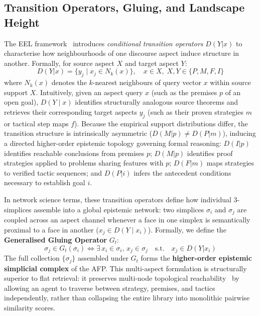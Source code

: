 \documentclass{svproc}
\begin{document}
\subsection{Transition Operators, Gluing, and Landscape Height}\label{sec:operators}

The EEL framework~\cite{correia_eel_inprep} introduces \emph{conditional transition operators} $D(Y | x)$ to characterise how neighbourhoods of one discourse aspect induce structure in another. Formally, for source aspect $X$ and target aspect $Y$:
\begin{equation}
D(Y | x) = \{ y_j \mid x_j \in N_k(x) \}, \quad x \in X,\; X, Y \in \{P, M, F, I\}
\end{equation}
where $N_k(x)$ denotes the $k$-nearest neighbours of query vector $x$ within source support $X$. Intuitively, given an aspect query $x$ (such as the premises $p$ of an open goal), $D(Y \mid x)$ identifies structurally analogous source theorems and retrieves their corresponding target aspects $y_j$ (such as their proven strategies $m$ or tactical step maps $f$). Because the empirical support distributions differ, the transition structure is intrinsically asymmetric ($D(M | p) \ne D(P | m)$), inducing a directed higher-order epistemic topology governing formal reasoning: $D(I | p)$ identifies reachable conclusions from premises $p$; $D(M | p)$ identifies proof strategies applied to problems sharing features with $p$; $D(F | m)$ maps strategies to verified tactic sequences; and $D(P | i)$ infers the antecedent conditions necessary to establish goal $i$.

In network science terms, these transition operators define how individual 3-simplices assemble into a global epistemic network: two simplices $\sigma_i$ and $\sigma_j$ are coupled across an aspect channel whenever a face in one simplex is semantically proximal to a face in another ($x_j \in D(Y \mid x_i)$). Formally, we define the \textbf{Generalised Gluing Operator} $G_t$:
\begin{equation}
\sigma_j \in G_t(\sigma_i) \iff \exists\, x_i \in \sigma_i, \, x_j \in \sigma_j \quad \text{s.t.} \quad x_j \in D(Y | x_i)
\end{equation}
The full collection $\{\sigma_j\}$ assembled under $G_t$ forms the \textbf{higher-order epistemic simplicial complex} of the AFP. This multi-aspect formulation is structurally superior to flat retrieval: it preserves multi-node topological reachability~\cite{yassin_high-order_2026} by allowing an agent to traverse between strategy, premises, and tactics independently, rather than collapsing the entire library into monolithic pairwise similarity scores.
\end{document}
